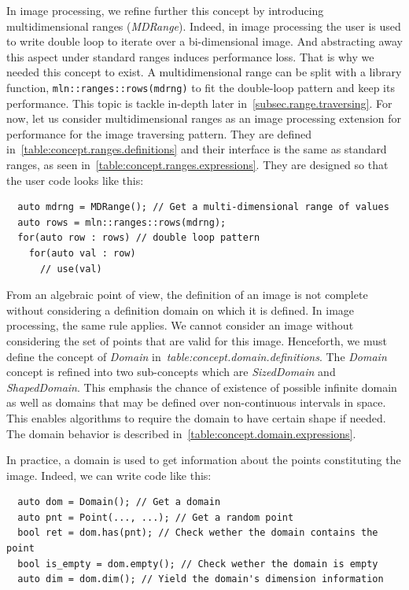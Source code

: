 In image processing, we refine further this concept by introducing multidimensional ranges (\emph{MDRange}). Indeed, in
image processing the user is used to write double loop to iterate over a bi-dimensional image. And abstracting away this
aspect under standard ranges induces performance loss. That is why we needed this concept to exist. A multidimensional
range can be split with a library function, \texttt{mln::ranges::rows(mdrng)} to fit the double-loop pattern and keep
its performance. This topic is tackle in-depth later in~\cref{subsec.range.traversing}. For now, let us consider
multidimensional ranges as an image processing extension for performance for the image traversing pattern. They are
defined in~\cref{table:concept.ranges.definitions} and their interface is the same as standard ranges, as seen
in~\cref{table:concept.ranges.expressions}. They are designed so that the user code looks like this:
\begin{verbatim}
  auto mdrng = MDRange(); // Get a multi-dimensional range of values
  auto rows = mln::ranges::rows(mdrng);
  for(auto row : rows) // double loop pattern
    for(auto val : row)
      // use(val)
\end{verbatim}

From an algebraic point of view, the definition of an image is not complete without considering a definition domain on
which it is defined. In image processing, the same rule applies. We cannot consider an image without considering the set
of points that are valid for this image. Henceforth, we must define the concept of \emph{Domain}
in~\emph{table:concept.domain.definitions}. The \emph{Domain} concept is refined into two sub-concepts which are
\emph{SizedDomain} and \emph{ShapedDomain}. This emphasis the chance of existence of possible infinite domain as
well as domains that may be defined over non-continuous intervals in space. This enables algorithms to require the
domain to have certain shape if needed. The domain behavior is described in~\cref{table:concept.domain.expressions}.

In practice, a domain is used to get information about the points constituting the image. Indeed, we can write code
like this:
\begin{verbatim}
  auto dom = Domain(); // Get a domain
  auto pnt = Point(..., ...); // Get a random point
  bool ret = dom.has(pnt); // Check wether the domain contains the point
  bool is_empty = dom.empty(); // Check wether the domain is empty
  auto dim = dom.dim(); // Yield the domain's dimension information
\end{verbatim}

